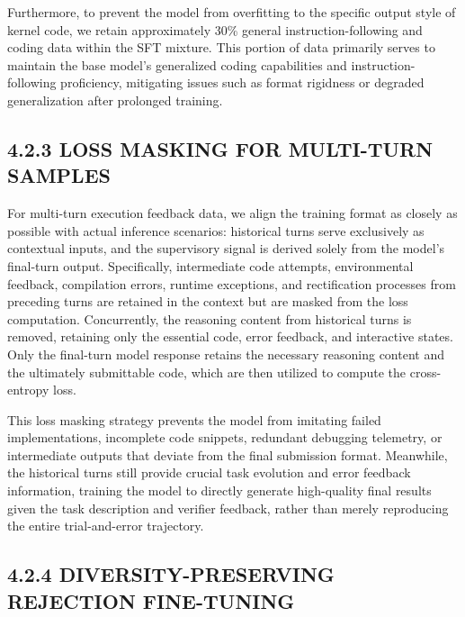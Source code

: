 \documentclass[
  10
]{article}
\begin{document}
Furthermore, to prevent the model from overfitting to the specific
output style of kernel code, we retain approximately 30\% general
instruction-following and coding data within the SFT mixture. This
portion of data primarily serves to maintain the base model's
generalized coding capabilities and instruction-following proficiency,
mitigating issues such as format rigidness or degraded generalization
after prolonged training.

\subsection{4.2.3 LOSS MASKING FOR MULTI-TURN
SAMPLES}\label{loss-masking-for-multi-turn-samples}

For multi-turn execution feedback data, we align the training format as
closely as possible with actual inference scenarios: historical turns
serve exclusively as contextual inputs, and the supervisory signal is
derived solely from the model's final-turn output. Specifically,
intermediate code attempts, environmental feedback, compilation errors,
runtime exceptions, and rectification processes from preceding turns are
retained in the context but are masked from the loss computation.
Concurrently, the reasoning content from historical turns is removed,
retaining only the essential code, error feedback, and interactive
states. Only the final-turn model response retains the necessary
reasoning content and the ultimately submittable code, which are then
utilized to compute the cross-entropy loss.

This loss masking strategy prevents the model from imitating failed
implementations, incomplete code snippets, redundant debugging
telemetry, or intermediate outputs that deviate from the final
submission format. Meanwhile, the historical turns still provide crucial
task evolution and error feedback information, training the model to
directly generate high-quality final results given the task description
and verifier feedback, rather than merely reproducing the entire
trial-and-error trajectory.

\subsection{4.2.4 DIVERSITY-PRESERVING REJECTION
FINE-TUNING}\label{diversity-preserving-rejection-fine-tuning}
\end{document}
